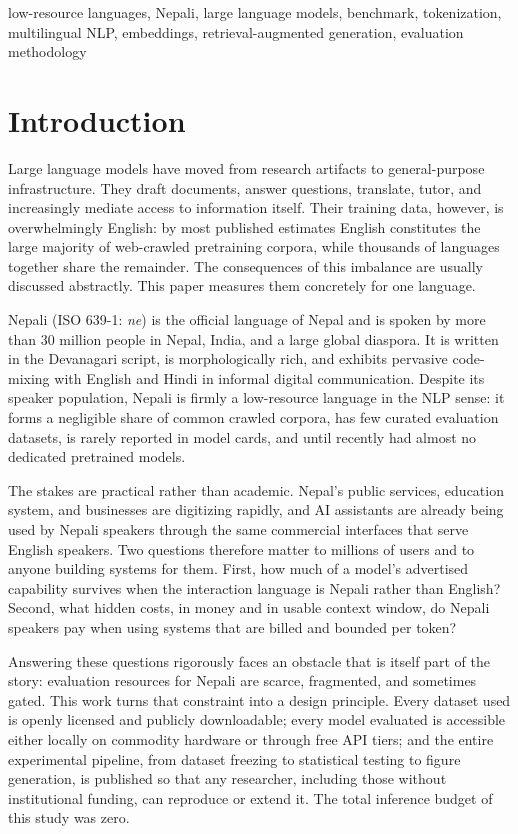 \documentclass[conference]{IEEEtran}
\begin{document}
\begin{abstract}
\end{abstract}

\begin{IEEEkeywords}
low-resource languages, Nepali, large language models, benchmark, tokenization, multilingual NLP, embeddings, retrieval-augmented generation, evaluation methodology
\end{IEEEkeywords}

\section{Introduction}
Large language models have moved from research artifacts to general-purpose infrastructure. They draft documents, answer questions, translate, tutor, and increasingly mediate access to information itself. Their training data, however, is overwhelmingly English: by most published estimates English constitutes the large majority of web-crawled pretraining corpora, while thousands of languages together share the remainder. The consequences of this imbalance are usually discussed abstractly. This paper measures them concretely for one language.

Nepali (ISO 639-1: \emph{ne}) is the official language of Nepal and is spoken by more than 30 million people in Nepal, India, and a large global diaspora. It is written in the Devanagari script, is morphologically rich, and exhibits pervasive code-mixing with English and Hindi in informal digital communication. Despite its speaker population, Nepali is firmly a low-resource language in the NLP sense: it forms a negligible share of common crawled corpora, has few curated evaluation datasets, is rarely reported in model cards, and until recently had almost no dedicated pretrained models.

The stakes are practical rather than academic. Nepal's public services, education system, and businesses are digitizing rapidly, and AI assistants are already being used by Nepali speakers through the same commercial interfaces that serve English speakers. Two questions therefore matter to millions of users and to anyone building systems for them. First, how much of a model's advertised capability survives when the interaction language is Nepali rather than English? Second, what hidden costs, in money and in usable context window, do Nepali speakers pay when using systems that are billed and bounded per token?

Answering these questions rigorously faces an obstacle that is itself part of the story: evaluation resources for Nepali are scarce, fragmented, and sometimes gated. This work turns that constraint into a design principle. Every dataset used is openly licensed and publicly downloadable; every model evaluated is accessible either locally on commodity hardware or through free API tiers; and the entire experimental pipeline, from dataset freezing to statistical testing to figure generation, is published so that any researcher, including those without institutional funding, can reproduce or extend it. The total inference budget of this study was zero.
\end{document}
